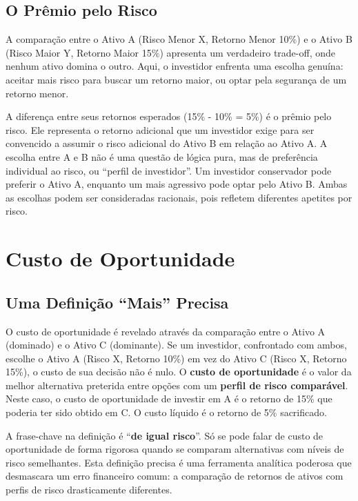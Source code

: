 \documentclass[
  a4paper,
]{book}
\begin{document}
\subsection{O Prêmio pelo Risco}\label{o-pruxeamio-pelo-risco}

A comparação entre o Ativo A (Risco Menor X, Retorno Menor 10\%) e o
Ativo B (Risco Maior Y, Retorno Maior 15\%) apresenta um verdadeiro
trade-off, onde nenhum ativo domina o outro. Aqui, o investidor enfrenta
uma escolha genuína: aceitar mais risco para buscar um retorno maior, ou
optar pela segurança de um retorno menor.

A diferença entre seus retornos esperados (15\% - 10\% = 5\%) é o prêmio
pelo risco. Ele representa o retorno adicional que um investidor exige
para ser convencido a assumir o risco adicional do Ativo B em relação ao
Ativo A. A escolha entre A e B não é uma questão de lógica pura, mas de
preferência individual ao risco, ou ``perfil de investidor''. Um
investidor conservador pode preferir o Ativo A, enquanto um mais
agressivo pode optar pelo Ativo B. Ambas as escolhas podem ser
consideradas racionais, pois refletem diferentes apetites por risco.

\section{Custo de Oportunidade}\label{custo-de-oportunidade}

\subsection{Uma Definição ``Mais''
Precisa}\label{uma-definiuxe7uxe3o-mais-precisa}

O custo de oportunidade é revelado através da comparação entre o Ativo A
(dominado) e o Ativo C (dominante). Se um investidor, confrontado com
ambos, escolhe o Ativo A (Risco X, Retorno 10\%) em vez do Ativo C
(Risco X, Retorno 15\%), o custo de sua decisão não é nulo. O
\textbf{custo de oportunidade} é o valor da melhor alternativa preterida
entre opções com um \textbf{perfil de risco comparável}. Neste caso, o
custo de oportunidade de investir em A é o retorno de 15\% que poderia
ter sido obtido em C. O custo líquido é o retorno de 5\% sacrificado.

A frase-chave na definição é ``\textbf{de igual risco}''. Só se pode
falar de custo de oportunidade de forma rigorosa quando se comparam
alternativas com níveis de risco semelhantes. Esta definição precisa é
uma ferramenta analítica poderosa que desmascara um erro financeiro
comum: a comparação de retornos de ativos com perfis de risco
drasticamente diferentes.
\end{document}
